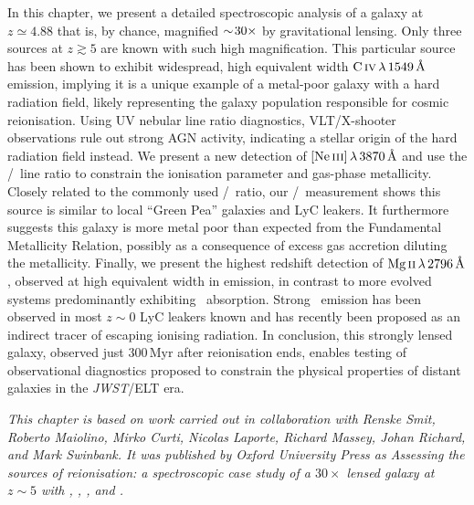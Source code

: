 \noindent In this chapter, we present a detailed spectroscopic analysis of a galaxy at $z \simeq 4.88$ that is, by chance, magnified $\sim \! 30\times$ by gravitational lensing. Only three sources at $z \gtrsim 5$ are known with such high magnification. This particular source has been shown to exhibit widespread, high equivalent width $\CIV \, \lambda \, 1549 \, \Angstrom$ emission, implying it is a unique example of a metal-poor galaxy with a hard radiation field, likely representing the galaxy population responsible for cosmic reionisation. Using UV nebular line ratio diagnostics, VLT/X-shooter observations rule out strong AGN activity, indicating a stellar origin of the hard radiation field instead. We present a new detection of $\NeIII \, \lambda \, 3870 \, \Angstrom$ and use the \NeIII/\OII\ line ratio to constrain the ionisation parameter and gas-phase metallicity. Closely related to the commonly used \OIIIf/\OII\ ratio, our \NeIII/\OII\ measurement shows this source is similar to local ``Green Pea'' galaxies and LyC leakers. It furthermore suggests this galaxy is more metal poor than expected from the Fundamental Metallicity Relation, possibly as a consequence of excess gas accretion diluting the metallicity. Finally, we present the highest redshift detection of $\MgII \, \lambda \, 2796 \, \Angstrom$, observed at high equivalent width in emission, in contrast to more evolved systems predominantly exhibiting \MgII\ absorption. Strong \MgII\ emission has been observed in most $z \sim 0$ LyC leakers known and has recently been proposed as an indirect tracer of escaping ionising radiation. In conclusion, this strongly lensed galaxy, observed just $300 \, \mathrm{Myr}$ after reionisation ends, enables testing of observational diagnostics proposed to constrain the physical properties of distant galaxies in the \textit{JWST}/ELT era.

\vspace{3ex}
\begin{mdframed}[backgroundcolor=black!2.5]
    \textsl{This chapter is based on work carried out in collaboration with Renske Smit, Roberto Maiolino, Mirko Curti, Nicolas Laporte, Richard Massey, Johan Richard, and Mark Swinbank. It was published by Oxford University Press as \textup{Assessing the sources of reionisation: a spectroscopic case study of a $30\times$ lensed galaxy at $z \sim 5$ with \lya, \CIV, \MgII, and \NeIII} \citep[, MNRAS, 508, 1686]{2021MNRAS.508.1686W}.}
\end{mdframed}
\vspace*{\fill}

